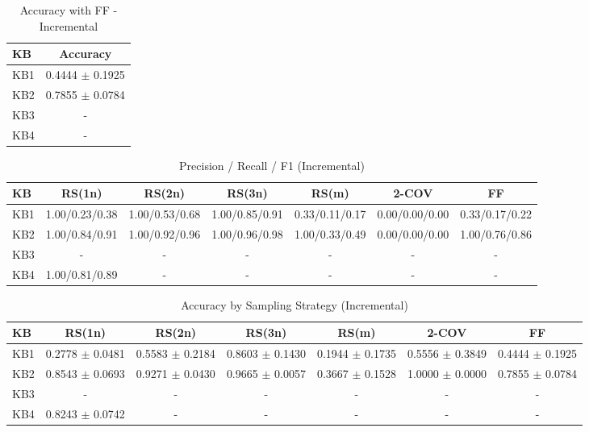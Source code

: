 \begin{table}[htbp]
\centering
\caption{Accuracy with FF - Incremental}
\label{tab:table11_incremental}
\begin{tabular}{lc}
\toprule
KB & Accuracy \\
\midrule
KB1 & 0.4444 $\pm$ 0.1925 \\
KB2 & 0.7855 $\pm$ 0.0784 \\
KB3 & - \\
KB4 & - \\
\bottomrule
\end{tabular}
\end{table}

\begin{table}[htbp]
\centering
\caption{Precision / Recall / F1 (Incremental)}
\label{tab:fold_metrics_incremental}
\begin{tabular}{lcccccc}
\toprule
KB & RS(1n) & RS(2n) & RS(3n) & RS(m) & 2-COV & FF \\
\midrule
KB1 & 1.00/0.23/0.38 & 1.00/0.53/0.68 & 1.00/0.85/0.91 & 0.33/0.11/0.17 & 0.00/0.00/0.00 & 0.33/0.17/0.22 \\
KB2 & 1.00/0.84/0.91 & 1.00/0.92/0.96 & 1.00/0.96/0.98 & 1.00/0.33/0.49 & 0.00/0.00/0.00 & 1.00/0.76/0.86 \\
KB3 & - & - & - & - & - & - \\
KB4 & 1.00/0.81/0.89 & - & - & - & - & - \\
\bottomrule
\end{tabular}
\end{table}

\begin{table}[htbp]
\centering
\caption{Accuracy by Sampling Strategy (Incremental)}
\label{tab:accuracy_incremental}
\begin{tabular}{lcccccc}
\toprule
KB & RS(1n) & RS(2n) & RS(3n) & RS(m) & 2-COV & FF \\
\midrule
KB1 & 0.2778 $\pm$ 0.0481 & 0.5583 $\pm$ 0.2184 & 0.8603 $\pm$ 0.1430 & 0.1944 $\pm$ 0.1735 & 0.5556 $\pm$ 0.3849 & 0.4444 $\pm$ 0.1925 \\
KB2 & 0.8543 $\pm$ 0.0693 & 0.9271 $\pm$ 0.0430 & 0.9665 $\pm$ 0.0057 & 0.3667 $\pm$ 0.1528 & 1.0000 $\pm$ 0.0000 & 0.7855 $\pm$ 0.0784 \\
KB3 & - & - & - & - & - & - \\
KB4 & 0.8243 $\pm$ 0.0742 & - & - & - & - & - \\
\bottomrule
\end{tabular}
\end{table}

